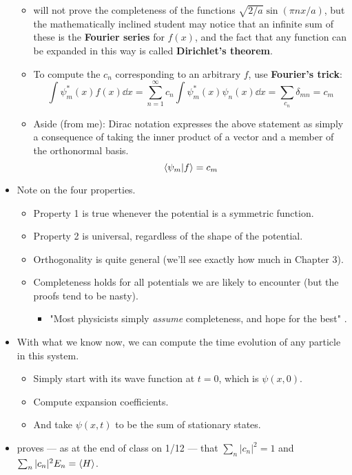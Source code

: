 \documentclass[../notes.tex]{subfiles}
\begin{document}
\begin{itemize}
    \begin{itemize}
        \item \textcite{bib:Griffiths} will not prove the completeness of the functions $\sqrt{2/a}\sin(\pi nx/a)$, but the mathematically inclined student may notice that an infinite sum of these is the \textbf{Fourier series} for $f(x)$, and the fact that any function can be expanded in this way is called \textbf{Dirichlet's theorem}.
        \item To compute the $c_n$ corresponding to an arbitrary $f$, use \textbf{Fourier's trick}:
        \begin{equation*}
            \int\psi_m^*(x)f(x)\dd{x} = \sum_{n=1}^\infty c_n\int\psi_m^*(x)\psi_n(x)\dd{x}
            = \sum_{c_n}\delta_{mn}
            = c_m
        \end{equation*}
        \item Aside (from me): Dirac notation expresses the above statement as simply a consequence of taking the inner product of a vector and a member of the orthonormal basis.
        \begin{equation*}
            \braket{\psi_m}{f} = c_m
        \end{equation*}
    \end{itemize}
    \item Note on the four properties.
    \begin{itemize}
        \item Property 1 is true whenever the potential is a symmetric function.
        \item Property 2 is universal, regardless of the shape of the potential.
        \item Orthogonality is quite general (we'll see exactly how much in Chapter 3).
        \item Completeness holds for all potentials we are likely to encounter (but the proofs tend to be nasty).
        \begin{itemize}
            \item "Most physicists simply \emph{assume} completeness, and hope for the best" \parencite[52]{bib:Griffiths}.
        \end{itemize}
    \end{itemize}
    \item With what we know now, we can compute the time evolution of any particle in this system.
    \begin{itemize}
        \item Simply start with its wave function at $t=0$, which is $\psi(x,0)$.
        \item Compute expansion coefficients.
        \item And take $\psi(x,t)$ to be the sum of stationary states.
    \end{itemize}
    \item \textcite{bib:Griffiths} proves --- as at the end of class on 1/12 --- that $\sum_n|c_n|^2=1$ and $\sum_n|c_n|^2E_n=\langle{H}\rangle$.
\end{itemize}
\end{document}
